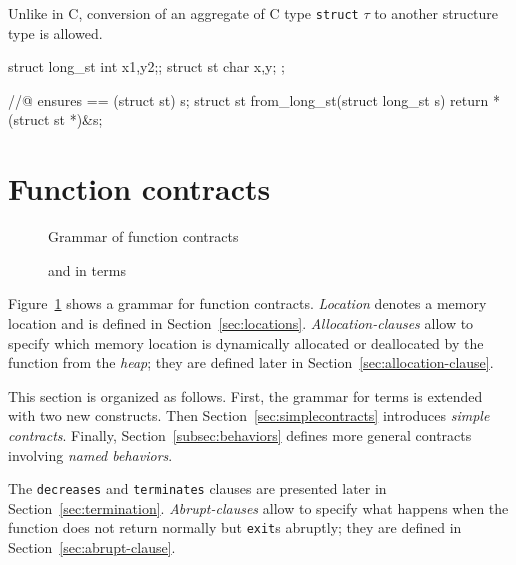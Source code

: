 \begin{example}
Unlike in C, conversion of an aggregate of C type \lstinline|struct| $\tau$  to another structure type is allowed.

\begin{listing-nonumber}
  struct long_st { int x1,y2;};
  struct st { char x,y; };
  
  //@ ensures \result == (struct st) s;
  struct st from_long_st(struct long_st s) {
     return *(struct st *)&s;
  }
\end{listing-nonumber}
\end{example}

\section{Function contracts}
\label{sec:fn-behavior}

\begin{figure}[t]
  \begin{cadre}
      
   \end{cadre}
    \caption{Grammar of function contracts}
  \label{fig:gram:contracts}
\end{figure}

\begin{figure}[t]
  \begin{cadre}
      
    \end{cadre}
    \caption{\protect\old and \protect\result in terms}
  \label{fig:gram:oldandresult}
\end{figure}

Figure~\ref{fig:gram:contracts} shows a grammar for function
contracts. \textsl{Location} denotes a memory location and is defined
in Section~\ref{sec:locations}. 
\textsl{Allocation-clauses} allow to specify which memory location 
is dynamically allocated or deallocated by the function from the \textsl{heap}; 
they are defined later in Section~\ref{sec:allocation-clause}.

This section is organized as follows.  First, the grammar for terms is
extended with two new constructs.  Then
Section~\ref{sec:simplecontracts} introduces \emph{simple contracts}.
Finally, Section~\ref{subsec:behaviors} defines more general contracts
involving \emph{named behaviors}. 

The \lstinline|decreases| and
\lstinline|terminates| clauses are presented later in
Section~\ref{sec:termination}.
\textsl{Abrupt-clauses}
allow to specify what happens when the function does not return
normally but \lstinline|exit|s abruptly; they are defined in
Section~\ref{sec:abrupt-clause}.


